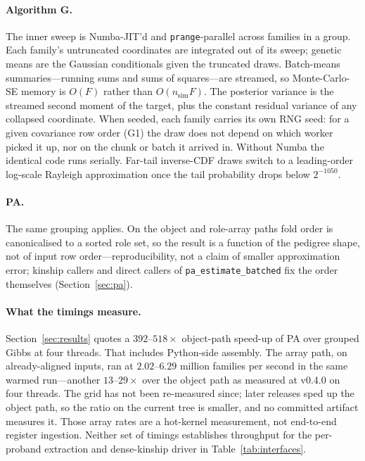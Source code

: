 \documentclass[11pt,a4paper]{article}
\begin{document}
\paragraph{Algorithm G.}
The inner sweep is Numba-JIT'd and \texttt{prange}-parallel across
families in a group.
Each family's untruncated coordinates are integrated out of its
sweep; genetic means are the Gaussian conditionals given the
truncated draws.
Batch-means summaries---running sums and sums of squares---are
streamed, so Monte-Carlo-SE memory is $O(F)$ rather than
$O(n_{\mathrm{sim}}F)$.
The posterior variance is the streamed second moment of the
target, plus the constant residual variance of any collapsed
coordinate.
When seeded, each family carries its own RNG seed: for a given
covariance row order (G1) the draw does not depend on which worker picked it up, nor on the chunk or batch
it arrived in.
Without Numba the identical code runs serially.
Far-tail inverse-CDF draws switch to a leading-order log-scale
Rayleigh approximation once the tail probability drops below $2^{-1050}$.

\paragraph{PA.}
The same grouping applies.
On the object and role-array paths fold order is canonicalised to a sorted role set,
so the result is a function of the pedigree shape, not of input row
order---reproducibility, not a claim of smaller approximation error;
kinship callers and direct callers of \texttt{pa\_estimate\_batched} fix
the order themselves
(Section~\ref{sec:pa}).

\paragraph{What the timings measure.}
Section~\ref{sec:results} quotes a $392$--$518\times$ object-path
speed-up of PA over grouped Gibbs at four threads.
That includes Python-side assembly.
The array path, on already-aligned inputs, ran at $2.02$--$6.29$
million families per second in the same warmed run---another
$13$--$29\times$ over the object path as measured at v0.4.0
on four threads. The grid has not been re-measured since;
later releases sped up the object path, so the ratio on the
current tree is smaller, and no committed artifact measures it.
Those array rates are a hot-kernel measurement, not end-to-end
register ingestion.
Neither set of timings establishes throughput for the per-proband
extraction and dense-kinship driver in Table~\ref{tab:interfaces}.
\end{document}
